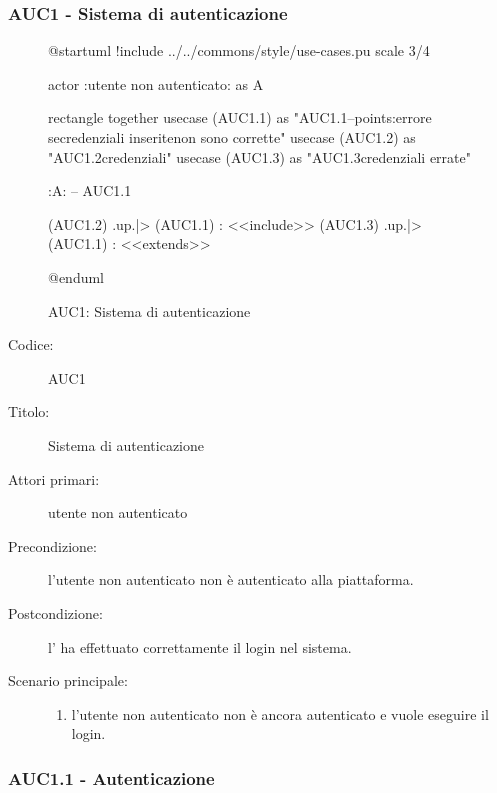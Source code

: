 \documentclass[casi-duso]{subfiles}
\begin{document}
\subsubsection{AUC1 - Sistema di autenticazione}%
\label{subsub:AUC1}

\begin{figure}[h!]
  \centering
  \begin{plantuml}
  @startuml
  !include ../../commons/style/use-cases.pu
  scale 3/4

  actor :utente non autenticato: as A

  rectangle {
    together {
      usecase (AUC1.1) as "AUC1.1\nAutenticazione\n--\nExtension points:\nVisualizzazione errore se\nle credenziali inserite\n non sono corrette"
      usecase (AUC1.2) as "AUC1.2\nVerifica credenziali"
      usecase (AUC1.3) as "AUC1.3\nVisualizzazione credenziali errate"
    }
  }

  :A: -- AUC1.1

  (AUC1.2) .up.|> (AUC1.1) : <<include>>
  (AUC1.3) .up.|> (AUC1.1) : <<extends>>

  @enduml
  \end{plantuml}
  \caption{AUC1: Sistema di autenticazione}
  \label{fig:auc1}
\end{figure}

\begin{description}
  \item[Codice:] AUC1
  \item[Titolo:] Sistema di autenticazione
  \item[Attori primari:] utente non autenticato
  \item[Precondizione:] l'utente non autenticato non è autenticato alla piattaforma.
  \item[Postcondizione:] l' ha effettuato correttamente il login nel sistema.
  \item[Scenario principale:]
  \begin{enumerate}
    \item l'utente non autenticato non è ancora autenticato e vuole eseguire il login.
  \end{enumerate}
\end{description}

\subsubsection{AUC1.1 - Autenticazione}%
\label{subsub:AUC1.1}
\end{document}
